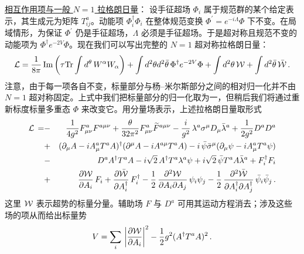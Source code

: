 \noindent\underline{相互作用项与一般 $N=1$ 拉格朗日量}：
设手征超场 $\Phi_i$ 属于规范群的某个给定表示，其生成元为矩阵 $T^a_{ij}$。动能项
$\Phi_i^\dagger\Phi_i$ 在整体规范变换
$\Phi^\prime=e^{-i\Lambda} \Phi$ 下不变。在局域情形，为保证 $\Phi^\prime$ 仍是手征超场，$\Lambda$ 必须是手征超场。于是超对称且规范不变的动能项为 $\Phi^\dagger e^{-2V}\Phi$。现在我们可以写出完整的 $N=1$ 超对称拉格朗日量：
\begin{equation}
{\cal L}=\frac{1}{8\pi}\,{\rm Im}\left(\tau{\rm Tr}\int d^\theta
\,W^\alpha W_\alpha \right)+\int d^2\theta d^2\bar\theta\,\Phi^\dagger 
e^{-2V}\Phi+ \int d^2\theta\,{\cal W}+\int d^2\bar\theta\,\bar{\cal W}\,.     
\label{fullSF}
\end{equation}
注意，由于每一项各自不变，标量部分与杨--米尔斯部分之间的相对归一化并不由 $N=1$ 超对称固定。上式中我们把标量部分的归一化取为一，但稍后我们将通过重新标度标量多重态 $\Phi$ 来改变它。用分量场表示，上述拉格朗日量取形式
\begin{eqnarray}
{\cal L}\,=&-&\frac{1}{4g^2}F^a_{\mu\nu}F^{a\mu\nu}+\frac{\theta} 
{32\pi^2}F^a_{\mu\nu}\widetilde F^{a\mu\nu}
-\frac{i}{g^2} \,\lambda^a \sigma^\mu D_\mu \bar{\lambda}^a 
+\frac{1}{2g^2}D^a D^a  \nonumber\\
&+& (\partial_\mu A-iA^a_\mu T^a A)^\dagger(\partial^\mu A-iA^{a\mu} 
T^a A) -i\,\bar{\psi} 
\bar{\sigma}^\mu (\partial_\mu\psi -iA^a_\mu T^a \psi)\nonumber\\
&-& D^a A^\dagger T^a A -i\sqrt{2}\,A^\dagger T^a \lambda^a
\psi+i\sqrt{2}\, \bar{\psi} T^a A \bar{\lambda}^a + F^\dagger_i F_i
\nonumber\\ 
&+&\frac{\partial {\cal W}}{\partial A_i} \, F_{i} +
\frac{\partial \bar{\cal W}}{\partial A^\dagger_i} \, F^\dagger_{i} -
\frac{1}{2}\,\frac{\partial^2 {\cal W}}{\partial A_i\partial A_j}\,
\psi_{i}\psi_{j}-\frac{1}{2}\,\frac{\partial^2 \bar{\cal W}} 
{\partial A_i^\dagger\partial
  A_j^\dagger}\,\bar{\psi}_{i}\bar{\psi}_{j}\,. 
\label{fullC}
\end{eqnarray}
这里 ${\cal W}$ 表示超势的标量分量。辅助场 $F$ 与 $D^a$ 可用其运动方程消去；涉及这些场的项从而给出标量势
\begin{equation}
V = \sum_i\,\left|\frac{\partial{\cal W}}{\partial A_i}\right|^2
-\frac{1}{2} g^2 (A^\dagger T^a A)^2\,.
\label{Spot}
\end{equation}


